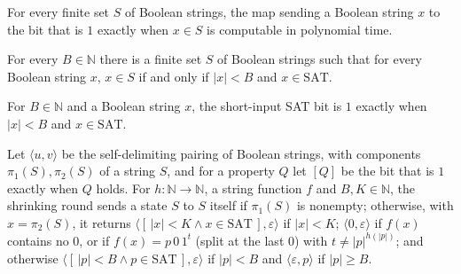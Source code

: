 \begin{theorem}
\label{Complexity.ladner_finite_lookup_FP}
\leanok
{}
For every finite set $S$ of Boolean strings, the map sending a Boolean string $x$ to the
bit that is $1$ exactly when $x\in S$ is computable in polynomial time.
\end{theorem}

\begin{theorem}
\label{Complexity.ladner_small_SAT_table}
\leanok
{}
For every $B\in\mathbb N$ there is a finite set $S$ of Boolean strings such that for every
Boolean string $x$, $x\in S$ if and only if $|x|<B$ and $x\in\mathrm{SAT}$.
\end{theorem}

\begin{definition}
\label{Complexity.ladner_smallSAT}
\leanok
{}
For $B\in\mathbb N$ and a Boolean string $x$, the short-input SAT bit is $1$ exactly when
$|x|<B$ and $x\in\mathrm{SAT}$.
\end{definition}

\begin{definition}
\label{Complexity.ladner_shrinkStep}
\leanok
{}
Let $\langle u,v\rangle$ be the self-delimiting pairing of Boolean strings, with
components $\pi_1(S),\pi_2(S)$ of a string $S$, and for a property $Q$ let $[Q]$ be the bit
that is $1$ exactly when $Q$ holds. For $h:\mathbb N\to\mathbb N$, a string function $f$ and
$B,K\in\mathbb N$, the shrinking round sends a state $S$ to $S$ itself if $\pi_1(S)$ is
nonempty; otherwise, with $x=\pi_2(S)$, it returns $\langle[\,|x|<K\wedge x\in\mathrm{SAT}\,],
\varepsilon\rangle$ if $|x|<K$; $\langle 0,\varepsilon\rangle$ if $f(x)$ contains no $0$, or
if $f(x)=p\,0\,1^t$ (split at the last $0$) with $t\ne|p|^{h(|p|)}$; and otherwise
$\langle[\,|p|<B\wedge p\in\mathrm{SAT}\,],\varepsilon\rangle$ if $|p|<B$ and
$\langle\varepsilon,p\rangle$ if $|p|\ge B$.
\end{definition}

